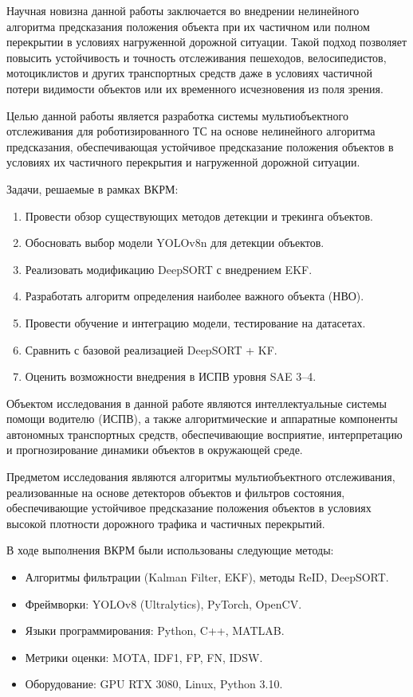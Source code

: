 Научная новизна данной работы заключается во внедрении нелинейного алгоритма предсказания положения объекта при их частичном или полном перекрытии в условиях нагруженной дорожной ситуации. Такой подход позволяет повысить устойчивость и точность отслеживания пешеходов, велосипедистов, мотоциклистов и других транспортных средств даже в условиях частичной потери видимости объектов или их временного исчезновения из поля зрения.

Целью данной работы является разработка системы мультиобъектного отслеживания для роботизированного ТС на основе нелинейного алгоритма предсказания, обеспечивающая устойчивое предсказание положения объектов в условиях их частичного перекрытия и нагруженной дорожной ситуации. 

Задачи, решаемые в рамках ВКРМ:

\begin{enumerate}
    \item Провести обзор существующих методов детекции и трекинга объектов.
    \item Обосновать выбор модели YOLOv8n для детекции объектов.
    \item Реализовать модификацию DeepSORT с внедрением EKF.
    \item Разработать алгоритм определения наиболее важного объекта (НВО).
    \item Провести обучение и интеграцию модели, тестирование на датасетах.
    \item Сравнить с базовой реализацией DeepSORT + KF.
    \item Оценить возможности внедрения в ИСПВ уровня SAE 3–4.
\end{enumerate}

Объектом исследования в данной работе являются интеллектуальные системы помощи водителю (ИСПВ), а также алгоритмические и аппаратные компоненты автономных транспортных средств, обеспечивающие восприятие, интерпретацию и прогнозирование динамики объектов в окружающей среде.

Предметом исследования являются алгоритмы мультиобъектного отслеживания, реализованные на основе детекторов объектов и фильтров состояния, обеспечивающие устойчивое предсказание положения объектов в условиях высокой плотности дорожного трафика и частичных перекрытий.

В ходе выполнения ВКРМ были использованы следующие методы:

\begin{itemize}
    \item Алгоритмы фильтрации (Kalman Filter, EKF), методы ReID, DeepSORT.
    \item Фреймворки: YOLOv8 (Ultralytics), PyTorch, OpenCV.
    \item Языки программирования: Python, C++, MATLAB.
    \item Метрики оценки: MOTA, IDF1, FP, FN, IDSW.
    \item Оборудование: GPU RTX 3080, Linux, Python 3.10.
\end{itemize}

